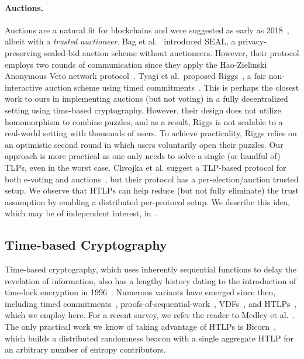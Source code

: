 \paragraph{Auctions.} 
Auctions are a natural fit for blockchains and were suggested as early as 2018~\cite{EPRINT:GalYou18}, albeit with a \emph{trusted auctioneer}. Bag et al.~\cite{TIFS:BHSR19} introduced SEAL, a privacy-preserving sealed-bid auction scheme without auctioneers. However, their protocol employs two rounds of communication since they apply the Hao-Zielinski Anonymous Veto network protocol~\cite{HaoZie06}. Tyagi et al.\ proposed Riggs~\cite{CCS:TAFWBM23}, a fair non-interactive auction scheme using timed commitments~\cite[\S6]{TCC:FKPS21}. This is perhaps the closest work to ours in implementing auctions (but not voting) in a fully decentralized setting using time-based cryptography. However, their design does not utilize homomorphism to combine puzzles, and as a result, Riggs is not scalable to a real-world setting with thousands of users. To achieve practicality, Riggs relies on an optimistic second round in which users voluntarily open their puzzles. %
Our approach is more practical as one only needs to solve a single (or handful of) TLPs, even in the worst case.
Chvojka et al. suggest a TLP-based protocol for both e-voting and auctions~\cite{ESORICS:CJSS21}, but their protocol has a per-election/auction trusted setup. We observe that HTLPs can help reduce (but not fully eliminate) the trust assumption by enabling a distributed per-protocol setup. We describe this idea, which may be of independent interest, in .

\subsection{Time-based Cryptography} 
Time-based cryptography, which uses inherently sequential functions to delay the revelation of information, also has a lengthy history dating to the introduction of time-lock encryption in 1996~\cite{RivShaWag96}.
Numerous variants have emerged since then, including timed commitments~\cite{C:BonNao00}, proofs-of-sequential-work~\cite{ITCS:MahMorVad13}, VDFs~\cite{C:BBBF18}, and HTLPs~\cite{C:MalThy19}, which we employ here.
For a recent survey, we refer the reader to Medley et al.~\cite{CSF:MedLoeQua23}. The only practical work we know of taking advantage of HTLPs is Bicorn~\cite{FC:CATB23}, which builds a distributed randomness beacon with a single aggregate HTLP for an arbitrary number of entropy contributors.

